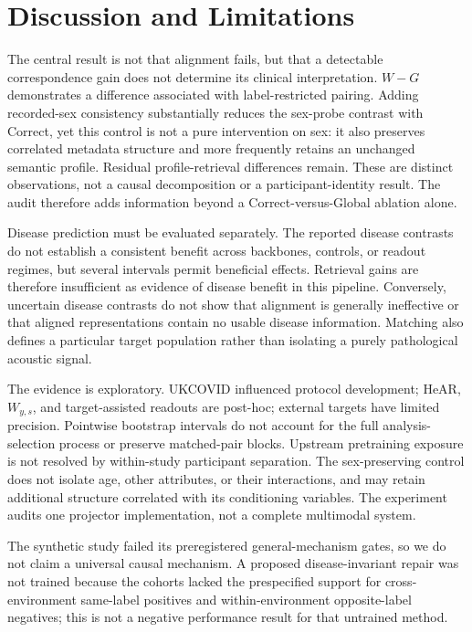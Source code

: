 \documentclass{article}
\newcommand{\wys}{\ensuremath{W_{y,s}}}
\begin{document}
\section{Discussion and Limitations}
\label{sec:discussion}

The central result is not that alignment fails, but that a detectable
correspondence gain does not determine its clinical interpretation. $W-G$
demonstrates a difference associated with label-restricted pairing. Adding
recorded-sex consistency substantially reduces the sex-probe contrast with
Correct, yet this control is not a pure intervention on sex: it also preserves
correlated metadata structure and more frequently retains an unchanged semantic
profile. Residual profile-retrieval differences remain. These are distinct
observations, not a causal decomposition or a participant-identity result. The
audit therefore adds information beyond a Correct-versus-Global ablation alone.

Disease prediction must be evaluated separately. The reported disease
contrasts do not establish a consistent benefit across backbones, controls,
or readout regimes, but several intervals permit beneficial effects. Retrieval
gains are therefore insufficient as evidence of disease benefit in this
pipeline. Conversely, uncertain disease contrasts do not show that alignment is
generally ineffective or that aligned representations contain no usable disease
information. Matching also defines a particular target population rather than
isolating a purely pathological acoustic signal.

The evidence is exploratory. UKCOVID influenced protocol development; HeAR,
\wys{}, and target-assisted readouts are post-hoc; external targets have
limited precision. Pointwise bootstrap intervals do not account for the
full analysis-selection process or preserve matched-pair blocks. Upstream
pretraining exposure is not resolved by within-study participant separation.
The sex-preserving control does not isolate age, other attributes, or their
interactions, and may retain additional structure correlated with its
conditioning variables. The experiment audits one projector implementation,
not a complete multimodal system.

The synthetic study failed its preregistered general-mechanism gates, so we
do not claim a universal causal mechanism. A proposed disease-invariant
repair was not trained because the cohorts lacked the prespecified support
for cross-environment same-label positives and within-environment
opposite-label negatives; this is not a negative performance result for
that untrained method.
\end{document}
